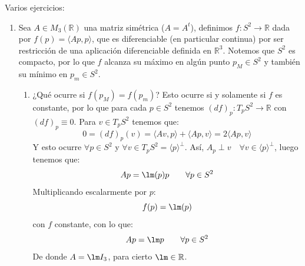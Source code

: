 \begin{ejercicio}
    Varios ejercicios:
    \begin{enumerate}
        \item Sea $A\in M_3(\mathbb{R})$ una matriz simétrica ($A=A^t$), definimos $f:S^2\to\mathbb{R}$ dada por $f(p) = \langle Ap,p \rangle $, que es diferenciable (en particular continua) por ser restricción de una aplicación diferenciable definida en $\mathbb{R}^3$. Notemos que $S^2$ es compacto, por lo que $f$ alcanza su máximo en algún punto $p_M\in S^2$ y también su mínimo en $p_m\in S^2$.

            \begin{enumerate}[label=\alph*)]
                \item ¿Qué ocurre si $f(p_M) = f(p_m)$? Esto ocurre si y solamente si $f$ es constante, por lo que para cada $p\in S^2$ tenemos $(d f)_p:T_pS^2\to \mathbb{R}$ con $(d f)_p\equiv 0$. Para $v\in T_pS^2$ tenemos que:
                    \begin{equation*}
                        0 = (d f)_p(v) = \langle Av,p \rangle  + \langle Ap, v \rangle = 2\langle Ap,v \rangle 
                    \end{equation*}
                    Y esto ocurre $\forall p\in S^2$ y $\forall v\in T_pS^2 = \langle p \rangle^\perp$. Así, $A_p\perp v\quad \forall v\in \langle p \rangle^\perp$, luego tenemos que:
                    \begin{equation*}
                        Ap = \lm(p)p \qquad \forall p\in S^2
                    \end{equation*}
                    Multiplicando escalarmente por $p$:
                    \begin{equation*}
                        f(p) = \lm(p)
                    \end{equation*}
                    con $f$ constante, con lo que:
                    \begin{equation*}
                        Ap = \lm p \qquad \forall p\in S^2
                    \end{equation*}
                    De donde $A=\lm I_3$, para cierto $\lm\in \mathbb{R}$.


\end{enumerate}
\end{enumerate}
\end{ejercicio}
